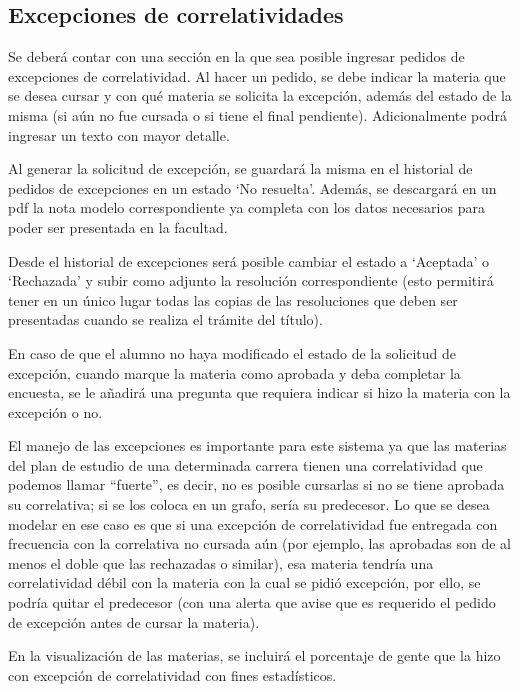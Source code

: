 \documentclass[a4paper]{article}
\begin{document}
\subsection{Excepciones de correlatividades}

Se deberá contar con una sección en la que sea posible ingresar pedidos de excepciones de correlatividad. Al hacer un pedido, se debe indicar la materia que se desea cursar y con qué materia se solicita la excepción, además del estado de la misma (si aún no fue cursada o si tiene el final pendiente). Adicionalmente podrá ingresar un texto con mayor detalle.

Al generar la solicitud de excepción, se guardará la misma en el historial de pedidos de excepciones en un estado `No resuelta'. Además, se descargará en un pdf la nota modelo correspondiente ya completa con los datos necesarios para poder ser presentada en la facultad.

Desde el historial de excepciones será posible cambiar el estado a `Aceptada' o `Rechazada' y subir como adjunto la resolución correspondiente (esto permitirá tener en un único lugar todas las copias de las resoluciones que deben ser presentadas cuando se realiza el trámite del título).\newline


En caso de que el alumno no haya modificado el estado de la solicitud de excepción, cuando marque la materia como aprobada y deba completar la encuesta, se le añadirá una pregunta que requiera indicar si hizo la materia con la excepción o no.\newline


El manejo de las excepciones es importante para este sistema ya que las materias del plan de estudio de una determinada carrera tienen una correlatividad que podemos llamar ``fuerte'', es decir, no es posible cursarlas si no se tiene aprobada su correlativa; si se los coloca en un grafo, sería su predecesor. Lo que se desea modelar en ese caso es que si una excepción de correlatividad fue entregada con frecuencia con la correlativa no cursada aún (por ejemplo, las aprobadas son de al menos el doble que las rechazadas o similar), esa materia tendría una correlatividad débil con la materia con la cual se pidió excepción, por ello, se podría quitar el predecesor (con una alerta que avise que es requerido el pedido de excepción antes de cursar la materia).\newline


En la visualización de las materias, se incluirá el porcentaje de gente que la hizo con excepción de correlatividad con fines estadísticos.
\end{document}
